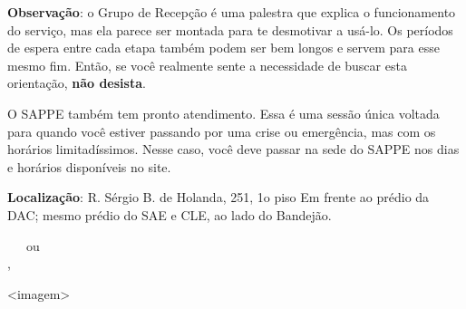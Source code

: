 \textbf{Observação}: o Grupo de Recepção é uma palestra que explica o funcionamento do
serviço, mas ela parece ser montada para te desmotivar a usá-lo. Os períodos de espera
entre cada etapa também podem ser bem longos e servem para esse mesmo fim. Então,
se você realmente sente a necessidade de buscar esta orientação, \textbf{não desista}.

O SAPPE também tem pronto atendimento. Essa é uma sessão única voltada para
quando você estiver passando por uma crise ou emergência, mas com os horários
limitadíssimos. Nesse caso, você deve passar na sede do SAPPE nos dias e horários
disponíveis no site.

\textbf{Localização}: R. Sérgio B. de Holanda, 251, 1o piso Em frente ao prédio da DAC; mesmo
prédio do SAE e CLE, ao lado do Bandejão.


\begin{tags}
     ~~~ou~~~  \\
     \sep {}
\end{tags}

<imagem>